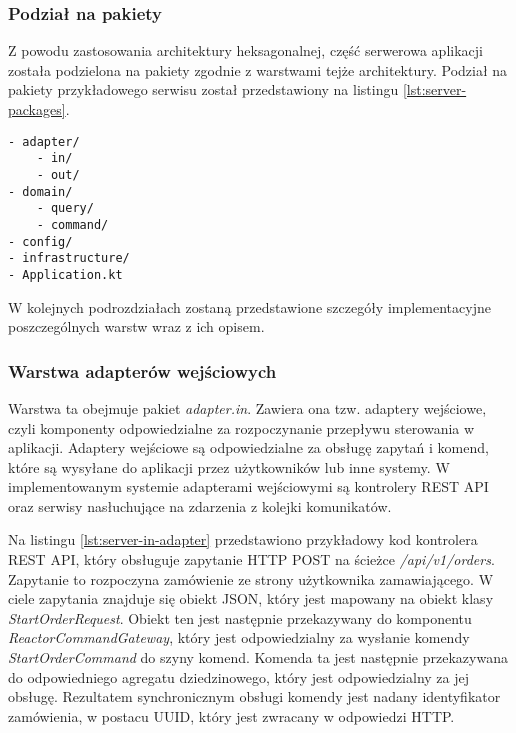 \subsubsection{Podział na pakiety}

Z powodu zastosowania architektury heksagonalnej, część serwerowa aplikacji została podzielona na pakiety zgodnie z warstwami tejże architektury. Podział na pakiety przykładowego serwisu został przedstawiony na listingu \ref{lst:server-packages}.

\begin{lstlisting}[caption={Podział na pakiety części serwerowej projektu},label={lst:server-packages},captionpos=b]
- adapter/
    - in/
    - out/
- domain/
    - query/
    - command/
- config/
- infrastructure/
- Application.kt
\end{lstlisting}

W kolejnych podrozdziałach zostaną przedstawione szczegóły implementacyjne poszczególnych warstw wraz z ich opisem.

\subsubsection{Warstwa adapterów wejściowych} 

Warstwa ta obejmuje pakiet \textit{adapter.in}. Zawiera ona tzw. adaptery wejściowe, czyli komponenty odpowiedzialne za rozpoczynanie przepływu sterowania w aplikacji. Adaptery wejściowe są odpowiedzialne za obsługę zapytań i komend, które są wysyłane do aplikacji przez użytkowników lub inne systemy. W implementowanym systemie adapterami wejściowymi są kontrolery REST API oraz serwisy nasłuchujące na zdarzenia z kolejki komunikatów.

Na listingu \ref{lst:server-in-adapter} przedstawiono przykładowy kod kontrolera REST API, który obsługuje zapytanie HTTP POST na ścieżce \textit{/api/v1/orders}. Zapytanie to rozpoczyna zamówienie ze strony użytkownika zamawiającego. W ciele zapytania znajduje się obiekt JSON, który jest mapowany na obiekt klasy \textit{StartOrderRequest}. Obiekt ten jest następnie przekazywany do komponentu \textit{ReactorCommandGateway}, który jest odpowiedzialny za wysłanie komendy \textit{StartOrderCommand} do szyny komend. Komenda ta jest następnie przekazywana do odpowiedniego agregatu dziedzinowego, który jest odpowiedzialny za jej obsługę. Rezultatem synchronicznym obsługi komendy jest nadany identyfikator zamówienia, w postacu UUID, który jest zwracany w odpowiedzi HTTP. 

